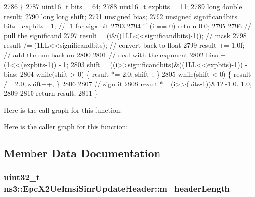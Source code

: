 \begin{DoxyCode}
2786 \{
2787   uint16\_t bits = 64;
2788   uint16\_t expbits = 11;
2789   \textcolor{keywordtype}{long} \textcolor{keywordtype}{double} result;
2790   \textcolor{keywordtype}{long} \textcolor{keywordtype}{long} shift;
2791   \textcolor{keywordtype}{unsigned} bias;
2792   \textcolor{keywordtype}{unsigned} significandbits = bits - expbits - 1; \textcolor{comment}{// -1 for sign bit}
2793 
2794   \textcolor{keywordflow}{if} (\hyperlink{bernuolliDistribution_8m_a6f6ccfcf58b31cb6412107d9d5281426}{i} == 0) \textcolor{keywordflow}{return} 0.0;
2795 
2796   \textcolor{comment}{// pull the significand}
2797   result = (\hyperlink{bernuolliDistribution_8m_a6f6ccfcf58b31cb6412107d9d5281426}{i}&((1LL<<significandbits)-1)); \textcolor{comment}{// mask}
2798   result /= (1LL<<significandbits); \textcolor{comment}{// convert back to float}
2799   result += 1.0f; \textcolor{comment}{// add the one back on}
2800 
2801   \textcolor{comment}{// deal with the exponent}
2802   bias = (1<<(expbits-1)) - 1;
2803   shift = ((\hyperlink{bernuolliDistribution_8m_a6f6ccfcf58b31cb6412107d9d5281426}{i}>>significandbits)&((1LL<<expbits)-1)) - bias;
2804   \textcolor{keywordflow}{while}(shift > 0) \{ result *= 2.0; shift--; \}
2805   \textcolor{keywordflow}{while}(shift < 0) \{ result /= 2.0; shift++; \}
2806 
2807   \textcolor{comment}{// sign it}
2808   result *= (\hyperlink{bernuolliDistribution_8m_a6f6ccfcf58b31cb6412107d9d5281426}{i}>>(bits-1))&1? -1.0: 1.0;
2809 
2810   \textcolor{keywordflow}{return} result;
2811 \}
\end{DoxyCode}


Here is the call graph for this function\+:




Here is the caller graph for this function\+:




\subsection{Member Data Documentation}
\subsubsection[{\texorpdfstring{m\+\_\+header\+Length}{m_headerLength}}]{\setlength{\rightskip}{0pt plus 5cm}uint32\+\_\+t ns3\+::\+Epc\+X2\+Ue\+Imsi\+Sinr\+Update\+Header\+::m\+\_\+header\+Length\hspace{0.3cm}{\ttfamily [private]}}\hypertarget{classns3_1_1EpcX2UeImsiSinrUpdateHeader_a4fa578039d08fdb164b748ec72478c7b}{}\label{classns3_1_1EpcX2UeImsiSinrUpdateHeader_a4fa578039d08fdb164b748ec72478c7b}
